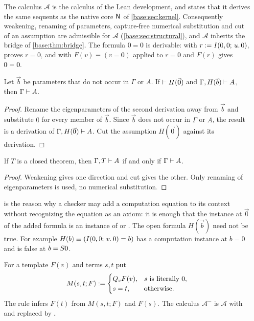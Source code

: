 The calculus $\mathcal A$ is the calculus  of the Lean development,
and  states that it derives the same sequents as the
native core $\mathsf{N}$ of \cref{base:sec:kernel}. Consequently weakening,
renaming of parameters, capture-free numerical substitution and cut of an
assumption are admissible for $\mathcal A$ (\cref{base:sec:structural}), and
$\mathcal A$ inherits the bridge of \cref{base:thm:bridge}. The formula $0=0$
is derivable: with $r\mathrel{:=}I(0,0;\,u.\,0)$,  proves $r=0$, and
 with $F(v)\equiv(v=0)$ applied to $r=0$ and $F(r)$ gives $0=0$.

\begin{lemma}\label{cert:lem:supply}
Let $\vec b$ be parameters that do not occur in $\Gamma$ or $A$. If
$\vdash H(\vec 0)$ and $\Gamma,H(\vec b)\vdash A$, then $\Gamma\vdash A$.
\end{lemma}
\begin{proof}
Rename the eigenparameters of the second derivation away from $\vec b$ and
substitute $0$ for every member of $\vec b$. Since $\vec b$ does not occur in
$\Gamma$ or $A$, the result is a derivation of $\Gamma,H(\vec 0)\vdash A$.
Cut the assumption $H(\vec 0)$ against its derivation.
\end{proof}

\begin{lemma}\label{cert:lem:neutral-resource}
If $T$ is a closed theorem, then $\Gamma,T\vdash A$ if and only if
$\Gamma\vdash A$.
\end{lemma}
\begin{proof}
Weakening gives one direction and cut gives the other. Only renaming of
eigenparameters is used, no numerical substitution.
\end{proof}

 is the reason why a checker may add a computation
equation to its context without recognizing the equation as an axiom: it is
enough that the instance at $\vec 0$ of the added formula is an instance of
 or . The open formula $H(\vec b)$ need not be
true. For example $H(b)\equiv(I(0,0;\,v.\,0)=b)$ has a computation instance
at $b=0$ and is false at $b=S 0$.

\begin{definition}\label{cert:def:Aminus}
For a template $F(v)$ and terms $s,t$ put
\[
M(s,t;F)\mathrel{:=}
\begin{cases}
Q_{v}F(v), & s\text{ is literally }0,\\
s=t, & \text{otherwise}.
\end{cases}
\]
The rule  infers $F(t)$ from $M(s,t;F)$ and $F(s)$. The calculus
$\mathcal A^{-}$ is $\mathcal A$ with  and  replaced
by .
\end{definition}

